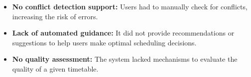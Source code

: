 \begin{itemize}
\item \textbf{No conflict detection support:} Users had to manually check for conflicts, increasing the risk of errors.
\item \textbf{Lack of automated guidance:} It did not provide recommendations or suggestions to help users make optimal scheduling decisions.
\item \textbf{No quality assessment:} The system lacked mechanisms to evaluate the quality of a given timetable.
\end{itemize}




